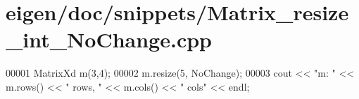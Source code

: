 \hypertarget{eigen_2doc_2snippets_2_matrix__resize__int___no_change_8cpp_source}{}\section{eigen/doc/snippets/\+Matrix\+\_\+resize\+\_\+int\+\_\+\+No\+Change.cpp}
\label{eigen_2doc_2snippets_2_matrix__resize__int___no_change_8cpp_source}

\begin{DoxyCode}
00001 MatrixXd m(3,4);
00002 m.resize(5, NoChange);
00003 cout << \textcolor{stringliteral}{"m: "} << m.rows() << \textcolor{stringliteral}{" rows, "} << m.cols() << \textcolor{stringliteral}{" cols"} << endl;
\end{DoxyCode}
